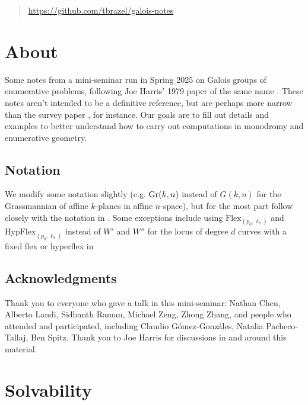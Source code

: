 \documentclass[11pt]{amsart}
\providecommand{\Flex}{\mathrm{Flex}}
\providecommand{\HypFlex}{\mathrm{HypFlex}}
\begin{document}
\begin{abstract} \href{https://github.com/tbrazel/galois-notes}{https://github.com/tbrazel/galois-notes}
\end{abstract}

\maketitle



\setcounter{section}{-1}
\section{About}

Some notes from a mini-seminar run in Spring 2025 on Galois groups of enumerative problems, following Joe Harris' 1979 paper of the same name \cite{Harris-Galois}. These notes aren't intended to be a definitive reference, but are perhaps more narrow than the survey paper \cite{SottileYahl}, for instance. Our goals are to fill out details and examples to better understand how to carry out computations in monodromy and enumerative geometry.

\subsection{Notation}

We modify some notation slightly (e.g. $\mathrm{Gr}(k,n)$ instead of $G(k,n)$ for the Grassmannian of affine $k$-planes in affine $n$-space), but for the most part follow closely with the notation in \cite{Harris-Galois}. Some exceptions include using $\Flex_{(p_0,\ell_0)}$ and $\HypFlex_{(p_0,\ell_0)}$ instead of $W'$ and $W''$ for the locus of degree $d$ curves with a fixed flex or hyperflex in 

\subsection{Acknowledgments}
Thank you to everyone who gave a talk in this mini-seminar: Nathan Chen, Alberto Landi, Sidhanth Raman, Michael Zeng, Zhong Zhang, and people who attended and participated, including Claudio Gómez-Gonzáles, Natalia Pacheco-Tallaj, Ben Spitz. Thank you to Joe Harris for discussions in and around this material.


\setcounter{tocdepth}{1}
\tableofcontents{}

\section{Solvability}
\end{document}
